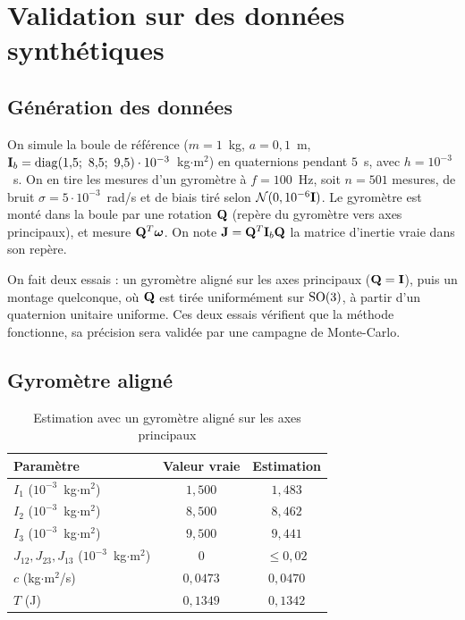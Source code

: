 
\section{Validation sur des données synthétiques}

\subsection{Génération des données}

On simule la boule de référence ($m = 1$~kg, $a = 0{,}1$~m,
$\mat{I}_b = \mathrm{diag}(1{,}5;\ 8{,}5;\ 9{,}5)\cdot 10^{-3}$~kg$\cdot$m$^2$)
en quaternions pendant $5$~s, avec $h = 10^{-3}$~s. On en tire les
mesures d'un gyromètre à $f = 100$~Hz, soit $n = 501$ mesures, de
bruit $\sigma = 5\cdot 10^{-3}$~rad/s et de biais tiré selon
$\mathcal{N}(0, 10^{-6}\mathbf{I})$. Le gyromètre est monté dans la boule par
une rotation $\mathbf{Q}$ (repère du gyromètre vers axes principaux), et
mesure $\mathbf{Q}^T\bm{\omega}$. On note $\mathbf{J} = \mathbf{Q}^T\mathbf{I}_b\mathbf{Q}$
la matrice d'inertie vraie dans son repère.

On fait deux essais : un gyromètre aligné sur les axes principaux
($\mathbf{Q} = \mathbf{I}$), puis un montage quelconque, où $\mathbf{Q}$ est tirée
uniformément sur $\mathrm{SO}(3)$, à partir d'un quaternion unitaire uniforme.
Ces deux essais vérifient que la méthode fonctionne, sa précision
sera validée par une campagne de Monte-Carlo.

\subsection{Gyromètre aligné}

\begin{table}[H]
    \centering
    \begin{tabular}{lcc}
        \toprule
        Paramètre & Valeur vraie & Estimation \\
        \midrule
        $I_1$ ($10^{-3}$~kg$\cdot$m$^2$) & $1{,}500$ & $1{,}483$ \\
        $I_2$ ($10^{-3}$~kg$\cdot$m$^2$) & $8{,}500$ & $8{,}462$ \\
        $I_3$ ($10^{-3}$~kg$\cdot$m$^2$) & $9{,}500$ & $9{,}441$ \\
        $J_{12}, J_{23}, J_{13}$ ($10^{-3}$~kg$\cdot$m$^2$) & $0$ & $\le 0{,}02$ \\
        $c$ (kg$\cdot$m$^2$/s) & $0{,}0473$ & $0{,}0470$ \\
        $T$ (J) & $0{,}1349$ & $0{,}1342$ \\
        \bottomrule
    \end{tabular}
    \caption{Estimation avec un gyromètre aligné sur les axes principaux}
    \label{tab-estimation-aligne}
\end{table}

